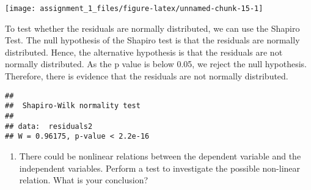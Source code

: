 \documentclass[
]{article}
\newenvironment{Shaded}{\begin{snugshade}}{\end{snugshade}}
\newcommand{\AttributeTok}[1]{\textcolor[rgb]{0.77,0.63,0.00}{#1}}
\newcommand{\FunctionTok}[1]{\textcolor[rgb]{0.00,0.00,0.00}{#1}}
\newcommand{\NormalTok}[1]{#1}
\newcommand{\OtherTok}[1]{\textcolor[rgb]{0.56,0.35,0.01}{#1}}
\newcommand{\SpecialCharTok}[1]{\textcolor[rgb]{0.00,0.00,0.00}{#1}}
\providecommand{\tightlist}{%
  \setlength{\itemsep}{0pt}\setlength{\parskip}{0pt}}
\begin{document}
\small

\begin{Shaded}
\end{Shaded}

\begin{center}\texttt{[image: assignment\_1\_files/figure-latex/unnamed-chunk-15-1]} \end{center}

\normalsize

To test whether the residuals are normally distributed, we can use the
Shapiro Test. The null hypothesis of the Shapiro test is that the
residuals are normally distributed. Hence, the alternative hypothesis is
that the residuals are not normally distributed. As the p value is below
0.05, we reject the null hypothesis. Therefore, there is evidence that
the residuals are not normally distributed.

\small

\begin{Shaded}
\end{Shaded}

\begin{verbatim}
## 
##  Shapiro-Wilk normality test
## 
## data:  residuals2
## W = 0.96175, p-value < 2.2e-16
\end{verbatim}

\normalsize

\begin{enumerate}
\def\labelenumi{\alph{enumi}.}
\setcounter{enumi}{3}
\tightlist
\item
  There could be nonlinear relations between the dependent variable and
  the independent variables. Perform a test to investigate the possible
  non-linear relation. What is your conclusion?
\end{enumerate}
\end{document}
